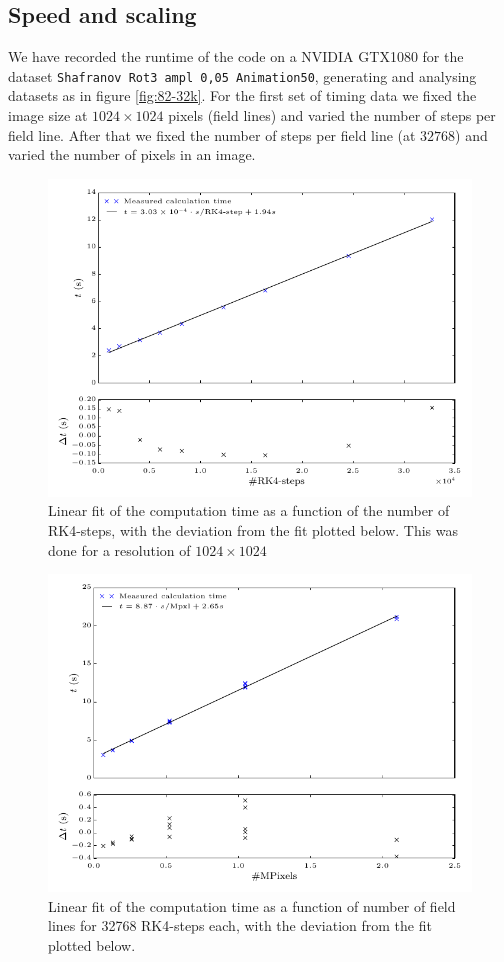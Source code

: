 \documentclass{article}
\begin{document}
\subsection{Speed and scaling}
We have recorded the runtime of the code on a NVIDIA GTX1080 for the dataset \texttt{Shafranov Rot3 ampl 0,05 Animation50}, generating and analysing datasets as in figure \ref{fig:82-32k}. For the first set of timing data we fixed the image size at $1024\times 1024$ pixels (field lines) and varied the number of steps per field line. After that we fixed the number of steps per field line (at $32768$) and varied the number of pixels in an image.\\
\begin{figure}[!ht]
	\includegraphics{Figures/timings_1.pdf}
	\caption{Linear fit of the computation time as a function of the number of RK4-steps, with the deviation from the fit plotted below. This was done for a resolution of $1024 \times 1024$}\label{fig:timings1}
\end{figure}
\begin{figure}[!ht]
	\includegraphics{Figures/timings_2.pdf}
	\caption{Linear fit of the computation time as a function of number of field lines for 32768 RK4-steps each, with the deviation from the fit plotted below.}\label{fig:timings2}
\end{figure}
\end{document}
